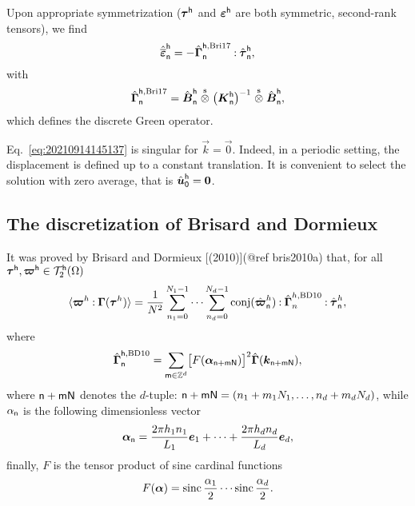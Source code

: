 Upon appropriate symmetrization (\(\boldsymbol\tau^\mathsf{h}\) and
\(\boldsymbol\varepsilon^\mathsf{h}\) are both symmetric, second-rank tensors), we find
\begin{equation}
  \hat{\overline{\boldsymbol\varepsilon}}_\mathsf{n}^\mathsf{h}=-\hat{\boldsymbol\Gamma}_\mathsf{n}^{\mathsf{h}, \text{Bri17}}\mathbin{\mathord{:}}\hat{\boldsymbol\tau}_\mathsf{n}^\mathsf{h},
\end{equation}
with
\begin{equation}
  \hat{\boldsymbol\Gamma}_\mathsf{n}^{\mathsf{h}, \text{Bri17}}
  =\hat{\boldsymbol B}_\mathsf{n}^\mathsf{h}
  \stackrel{\mathrm{s}}{\otimes}\bigl(\boldsymbol K_\mathsf{n}^\mathsf{h}\bigr)^{-1}
  \stackrel{\mathrm{s}}{\otimes}\hat{\boldsymbol B}_\mathsf{n}^\mathsf{h},
\end{equation}
which defines the discrete Green operator.

\begin{remark}
  Eq. \eqref{eq:20210914145137} is singular for \(\vec k = \vec 0\). Indeed, in a
  periodic setting, the displacement is defined up to a constant translation.  It
  is convenient to select the solution with zero average, that is
  \(\hat{\boldsymbol u}_\mathsf{0}^\mathsf{h}=\boldsymbol 0\).
\end{remark}

\subsection{The discretization of Brisard and Dormieux}

It was proved by Brisard and Dormieux [(2010)](@ref bris2010a) that, for all
\(\boldsymbol\tau^{\mathsf h}, \boldsymbol\varpi^{\mathsf h}\in\mathcal T_2^{\mathsf h}(\Omega)\)
\begin{equation}
  \langle\boldsymbol\varpi^h\mathbin{\mathord{:}}\boldsymbol\Gamma(\boldsymbol\tau^h)\rangle=\frac1{N^2}
  \sum_{n_1=0}^{N_1-1}\cdots\sum_{n_d=0}^{N_d-1}\operatorname{conj}(\hat{\boldsymbol\varpi}_
  {\mathsf{n}}^h)\mathbin{\mathord{:}}\hat{\boldsymbol\Gamma}_n^{h, \mathrm{BD10}}\mathbin{\mathord{:}}
  \hat{\boldsymbol\tau}_{\mathsf{n}}^h,
\end{equation}
where
\begin{equation}
  \hat{\boldsymbol\Gamma}_{\mathsf n}^{\mathsf h, \mathrm{BD10}}
  =\sum_{\mathsf m\in\mathbb Z^d}\bigl[F(\boldsymbol\alpha_{\mathsf n+\mathsf m\mathsf N})
  \bigr]^2\hat{\boldsymbol\Gamma}(\boldsymbol k_{\mathsf n+\mathsf m\mathsf N}),
\end{equation}
where \(\mathsf{n+mN}\) denotes the \(d\)-tuple:
\(\mathsf n+\mathsf m\mathsf N=(n_1+m_1N_1, \ldots, n_d+m_dN_d)\), while
\(\alpha_{\mathsf{n}}\) is the following dimensionless vector
\begin{equation}
  \boldsymbol\alpha_{\mathsf{n}}
  =\frac{2\pi h_1n_1}{L_1}\boldsymbol e_1+\cdots+\frac{2\pi h_dn_d}{L_d}\boldsymbol e_d,
\end{equation}
finally, \(F\) is the tensor product of sine cardinal functions
\begin{equation}
  F(\boldsymbol\alpha)=\operatorname{sinc}\frac{\alpha_1}2\cdots\operatorname{sinc}\frac{\alpha_d}2.
\end{equation}

